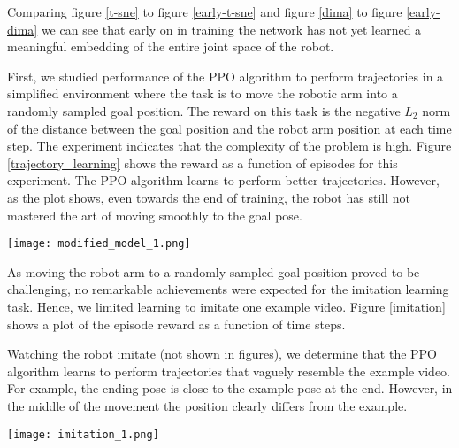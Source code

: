 Comparing figure \ref{t-sne} to figure \ref{early-t-sne} and figure \ref{dima} to figure \ref{early-dima} we can see that early on in training the network has not yet learned a meaningful embedding of the entire joint space of the robot.

First, we studied performance of the PPO algorithm to perform trajectories in a simplified environment where the task is to move the robotic arm into a randomly sampled goal position. The reward on this task is the negative $L_2$ norm of the distance between the goal position and the robot arm position at each time step. The experiment indicates that the complexity of the problem is high. Figure \ref{trajectory_learning} shows the reward as a function of episodes for this experiment. The PPO algorithm learns to perform better trajectories. However, as the plot shows, even towards the end of training, the robot has still not mastered the art of moving smoothly to the goal pose.

{
    \centering
    \texttt{[image: modified\_model\_1.png]}
    \label{trajectory_learning}
    \vspace{0.25cm}
}

As moving the robot arm to a randomly sampled goal position proved to be challenging, no remarkable achievements were expected for the imitation learning task. Hence, we limited learning to imitate one example video. Figure \ref{imitation} shows a plot of the episode reward as a function of time steps.

Watching the robot imitate (not shown in figures), we determine that the PPO algorithm learns to perform trajectories that vaguely resemble the example video. For example, the ending pose is close to the example pose at the end. However, in the middle of the movement the position clearly differs from the example.

{
    \centering
    \texttt{[image: imitation\_1.png]}
    \label{imitation}
    \vspace{0.25cm}
}